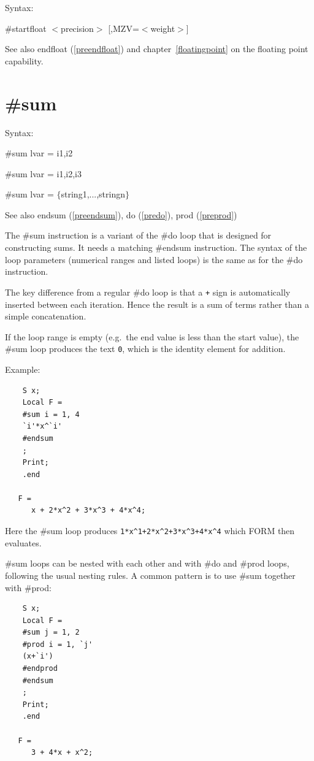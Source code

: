 \noindent Syntax:

\#startfloat $<$precision$>$ [,MZV=$<$weight$>$]

\noindent See also endfloat (\ref{preendfloat}) and chapter~\ref{floatingpoint} on the floating point capability.
 

\section{\#sum}
\label{presum}

\noindent Syntax:

\#sum lvar = i1,i2

\#sum lvar = i1,i2,i3

\#sum lvar = $\{$string1,...,stringn$\}$
 
\noindent See also endsum (\ref{preendsum}), do (\ref{predo}), 
                    prod (\ref{preprod})

\noindent The \#sum instruction is a variant 
of the \#do loop that is designed for constructing sums. It 
needs a matching \#endsum instruction. The syntax of the 
loop parameters (numerical ranges and listed loops) is the same as for 
the \#do instruction.

The key difference from a regular \#do loop is that a \verb:+: sign is 
automatically inserted between each iteration. Hence the result is a sum 
of terms rather than a simple concatenation.

If the loop range is empty (e.g.\ the end value is less than the start 
value), the \#sum loop produces the text \verb:0:, which is the identity 
element for addition.

Example:
\begin{verbatim}
    S x;
    Local F =
    #sum i = 1, 4
    `i'*x^`i'
    #endsum
    ;
    Print;
    .end

   F =
      x + 2*x^2 + 3*x^3 + 4*x^4;
\end{verbatim}
Here the \#sum loop produces \verb:1*x^1+2*x^2+3*x^3+4*x^4: which FORM 
then evaluates.

\#sum loops can be nested with each other and with \#do and \#prod loops, 
following the usual nesting rules. A common pattern is to use \#sum 
together with \#prod:
\begin{verbatim}
    S x;
    Local F =
    #sum j = 1, 2
    #prod i = 1, `j'
    (x+`i')
    #endprod
    #endsum
    ;
    Print;
    .end

   F =
      3 + 4*x + x^2;
\end{verbatim}

